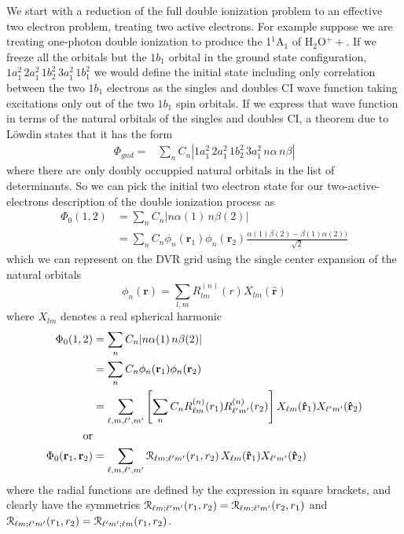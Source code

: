 \documentclass[%
pra%
,twocolumn%
,amssymb, nobibnotes, aps,
longbibliography
]{revtex4-1}
\begin{document}
We start with a reduction of the full double ionization problem to an effective two electron problem, treating two active electrons.  For example suppose we are treating one-photon double ionization to produce  the 1$^1$A$_1$ of H$_2$O$^++$.  If we freeze all the orbitals but the $1b_1$ orbital in the ground state configuration, $1a_1^2 \,  2a_1^2 \, 1b_2^2 \, 3a_1^2 \, 1b_1^2$ we would define the initial state including only correlation between the two $1b_1$ electrons as the singles and doubles CI wave function taking excitations only out of the two $1b_1$ spin orbitals.  If we express that wave function in terms of the natural orbitals of the singles and doubles CI, a theorem due to L\"owdin states that it has the form 
\begin{equation}
\begin{split}
\Phi_{gnd}   =& \sum_{n} C_{n}  |1a_1^2 \,  2a_1^2 \, 1b_2^2 \, 3a_1^2 \, n\alpha \, n\beta  |
\end{split}
\end{equation}
where there are only doubly occuppied natural orbitals in the list of determinants.  So we can pick the initial two electron state for our two-active-electrons description of the double ionization process as
\begin{equation}
\begin{split}
\Phi_0(1,2) &=  \sum_{n} C_{n}  |n\alpha(1)  \, n\beta(2)  | \\
& =  \sum_{n} C_{n} \phi_n(\mathbf{r}_1) \phi_n(\mathbf{r}_2) \frac{\alpha(1)\beta(2)-\beta(1)\alpha(2))}{\sqrt{2}}
\end{split}
\end{equation}
which we can represent on the DVR grid using the single center expansion of the natural orbitals
\begin{equation}
\phi_n(\mathbf{r}) = \sum_{l,m} R^{(n)}_{lm}(r) X_{lm} (  \mathbf{\hat{r}} )
\end{equation}
where $X_{lm}$ denotes a real spherical harmonic
\begin{equation}
\begin{split}
\Phi_0(1,2) &=  \sum_{n} C_{n}  |n\alpha(1)  \, n\beta(2)  | \\
& =  \sum_{n} C_{n} \phi_n(\mathbf{r}_1) \phi_n(\mathbf{r}_2) \\
& =  \sum_{\ell,m,\ell',m'} \left[  \sum_{n} C_{n} R^{(n)}_{\ell m}(r_1)  R^{(n)}_{\ell' m'}(r_2)\right]X_{\ell m} (  \mathbf{\hat{r}}_1 )X_{\ell' m'} (  \mathbf{\hat{r}}_2 ) \\
 \textrm{or} \\
\Phi_0(\mathbf{r}_1,\mathbf{r}_2) &= \sum_{\ell,m,\ell',m'} \EuScript{R}_{\ell m; \ell' m'}(r_1,r_2) \, X_{\ell m} (  \mathbf{\hat{r}}_1 )X_{\ell' m'} (  \mathbf{\hat{r}}_2 ) 
\end{split}
\end{equation}
where the radial functions are defined by the expression in square brackets, and clearly have the symmetries $\EuScript{R}_{\ell m ;\ell' m'}(r_1,r_2)=\EuScript{R}_{\ell m; \ell' m'}(r_2,r_1)$ and $\EuScript{R}_{\ell m; \ell' m'}(r_1,r_2)=\EuScript{R}_{\ell' m' ;\ell m}(r_1,r_2)$.
\\
\
\end{document}
